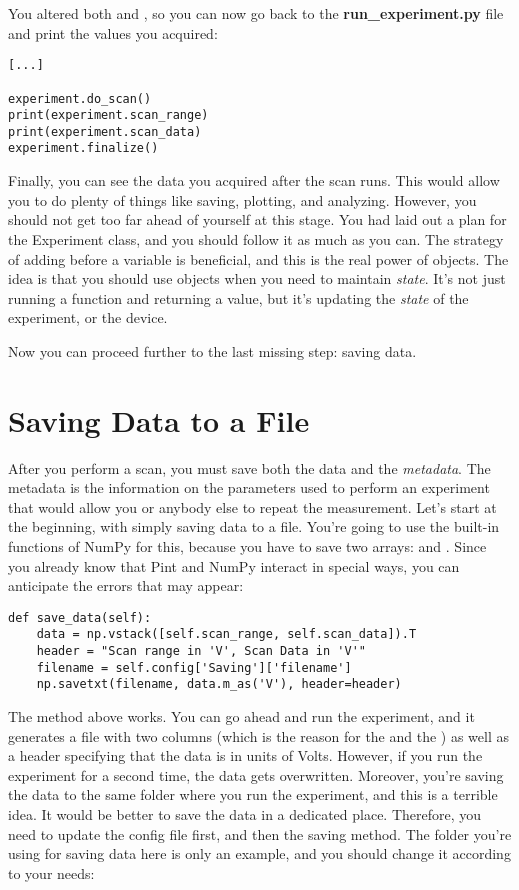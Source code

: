 You altered both  and , so you can now go back to the \textbf{run\_experiment.py} file and print the values you acquired:

\begin{verbatim}
[...]

experiment.do_scan()
print(experiment.scan_range)
print(experiment.scan_data)
experiment.finalize()
\end{verbatim}

Finally, you can see the data you acquired after the scan runs. This would allow you to do plenty of things like saving, plotting, and analyzing. However, you should not get too far ahead of yourself at this stage. You had laid out a plan for the Experiment class, and you should follow it as much as you can. The strategy of adding  before a variable is beneficial, and this is the real power of objects. The idea is that you should use objects when you need to maintain \emph{state}. It's not just running a function and returning a value, but it's updating the \emph{state} of the experiment, or the device.

Now you can proceed further to the last missing step: saving data.

\section{Saving Data to a File}\label{sec:saving-data}
After you perform a scan, you must save both the data and the \emph{metadata}. The metadata is the information on the parameters used to perform an experiment that would allow you or anybody else to repeat the measurement. Let's start at the beginning, with simply saving data to a file. You're going to use the built-in functions of NumPy for this, because you have to save two arrays:  and . Since you already know that Pint and NumPy interact in special ways, you can anticipate the errors that may appear:

\begin{verbatim}
def save_data(self):
    data = np.vstack([self.scan_range, self.scan_data]).T
    header = "Scan range in 'V', Scan Data in 'V'"
    filename = self.config['Saving']['filename']
    np.savetxt(filename, data.m_as('V'), header=header)
\end{verbatim}

The method above works. You can go ahead and run the experiment, and it generates a file with two columns (which is the reason for the  and the ) as well as a header specifying that the data is in units of Volts. However, if you run the experiment for a second time, the data gets overwritten. Moreover, you're saving the data to the same folder where you run the experiment, and this is a terrible idea. It would be better to save the data in a dedicated place. Therefore, you need to update the config file first, and then the saving method. The folder you're using for saving data here is only an example, and you should change it according to your needs:

